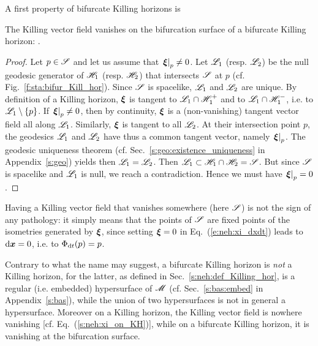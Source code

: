 A first property of bifurcate Killing horizons is
\begin{prop}
\label{p:sta:xi_S_zero}
The Killing vector field vanishes on the bifurcation surface of
a bifurcate Killing horizon:
\be \label{e:sta:xi_S_zero}
     .
\ee
\end{prop}
\begin{proof}
Let $p\in \mathscr{S}$ and let us assume that $\left.\bm{\xi}\right| _p\not=0$.
Let $\mathscr{L}_1$ (resp. $\mathscr{L}_2$) be the null geodesic generator of $\mathscr{H}_1$
(resp. $\mathscr{H}_2$) that intersects $\mathscr{S}$ at $p$ (cf. Fig.~\ref{f:sta:bifur_Kill_hor}).
Since $\mathscr{S}$ is spacelike,
$\mathscr{L}_1$ and $\mathscr{L}_2$ are unique. By definition of a Killing horizon,
$\bm{\xi}$ is tangent to $\mathscr{L}_1\cap\mathscr{H}_1^+$ and to $\mathscr{L}_1\cap\mathscr{H}_1^-$,
i.e. to $\mathscr{L}_1\setminus\{p\}$.
If $\left.\bm{\xi}\right| _p \not=0$, then by continuity,
$\bm{\xi}$ is a (non-vanishing) tangent vector field all along $\mathscr{L}_1$.
Similarly, $\bm{\xi}$ is tangent to all $\mathscr{L}_2$.
At their intersection point $p$, the geodesics $\mathscr{L}_1$ and $\mathscr{L}_2$ have thus a common tangent
vector, namely $\left.\bm{\xi}\right| _p$.
The geodesic uniqueness theorem (cf. Sec.~\ref{s:geo:existence_uniqueness} in Appendix~\ref{s:geo})
yields then $\mathscr{L}_1 = \mathscr{L}_2$.
Then $\mathscr{L}_1 \subset \mathscr{H}_1 \cap \mathscr{H}_2 = \mathscr{S}$. But since $\mathscr{S}$ is spacelike and
$\mathscr{L}_1$ is null, we reach a contradiction. Hence we must have
$\left.\bm{\xi}\right| _p = 0$.
\end{proof}

\begin{remark}
\label{r:sta:zero_Killing}
Having a Killing vector field that vanishes somewhere (here $\mathscr{S}$) is not the sign
of any pathology: it simply means that the points of $\mathscr{S}$ are fixed points of
the isometries generated by $\bm{\xi}$, since
setting $\bm{\xi}=0$ in Eq.~(\ref{e:neh:xi_dxdt}) leads to $\mathrm{d}\bm{x}=0$, i.e.
to $\Phi_{\mathrm{d} t}(p) = p$.
\end{remark}

\begin{remark}
Contrary to what the name may suggest, a bifurcate Killing horizon is \emph{not}
a Killing horizon, for the latter, as defined in Sec.~\ref{s:neh:def_Killing_hor},
is a regular (i.e. embedded) hypersurface
of $\mathscr{M}$ (cf. Sec.~\ref{s:bas:embed} in Appendix~\ref{s:bas}), while
the union of two hypersurfaces is not in general a hypersurface. Moreover
on a Killing horizon, the Killing vector field is nowhere vanishing
[cf. Eq.~(\ref{s:neh:xi_on_KH})], while on
a bifurcate Killing horizon, it is vanishing at the bifurcation surface.
\end{remark}

